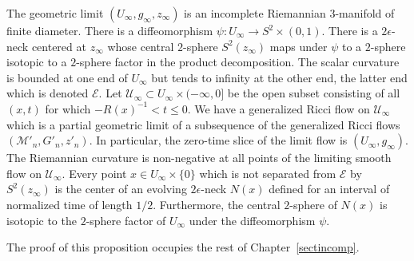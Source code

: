 \begin{proposition}
\label{prop:incomplete-limit-tube-properties}
\label{Uinfty}
The geometric limit $(U_\infty,g_\infty,z_\infty)$ is an incomplete
Riemannian $3$-manifold of finite diameter. There is a
diffeomorphism $\psi\colon U_\infty\to S^2\times (0,1)$. There is a
$2\epsilon$-neck centered at $z_\infty$ whose central $2$-sphere
$S^2(z_\infty)$ maps under $\psi$ to a $2$-sphere isotopic to a
$2$-sphere  factor in the product decomposition. The scalar
curvature is bounded at one end of $U_\infty$ but tends to infinity
at the other end, the latter end  which is denoted ${\mathcal E}$.
Let ${\mathcal U}_\infty\subset U_\infty\times(-\infty,0]$ be the
open subset consisting of all $(x,t)$ for which $-R(x)^{-1}<t\le 0$.
We have a generalized Ricci flow on ${\mathcal U}_\infty$ which is a
partial geometric limit of a subsequence of the generalized Ricci
flows $({\mathcal M}'_n,G'_n,z'_n)$. In particular, the zero-time
slice of the limit flow is $(U_\infty,g_\infty)$. The Riemannian
curvature is non-negative at all points of the limiting smooth flow
on ${\mathcal U}_\infty$. Every point $x\in U_\infty\times\{0\}$
which is not separated from ${\mathcal E}$ by $S^2(z_\infty)$ is the
center of an evolving $2\epsilon$-neck $N(x)$ defined for an
interval of normalized time of length $1/2$. Furthermore, the
central $2$-sphere of $N(x)$ is isotopic to the $2$-sphere factor of
$U_\infty$ under the diffeomorphism $\psi$.
\end{proposition}


The proof of this proposition occupies the rest of
Chapter~\ref{sectincomp}.

